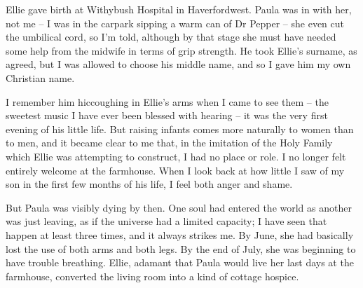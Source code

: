 Ellie gave birth at Withybush Hospital in Haverfordwest. Paula was in with her, not me -- I was in the carpark sipping a warm can of Dr Pepper -- she even cut the umbilical cord, so I'm told, although by that stage she must have needed some help from the midwife in terms of grip strength. He took Ellie's surname, as agreed, but I was allowed to choose his middle name, and so I gave him my own Christian name.

I remember him hiccoughing in Ellie's arms when I came to see them -- the sweetest music I have ever been blessed with hearing -- it was the very first evening of his little life. But raising infants comes more naturally to women than to men, and it became clear to me that, in the imitation of the Holy Family which Ellie was attempting to construct, I had no place or role. I no longer felt entirely welcome at the farmhouse. When I look back at how little I saw of my son in the first few months of his life, I feel both anger and shame.

But Paula was visibly dying by then. One soul had entered the world as another was just leaving, as if the universe had a limited capacity; I have seen that happen at least three times, and it always strikes me. By June, she had basically lost the use of both arms and both legs. By the end of July, she was beginning to have trouble breathing. Ellie, adamant that Paula would live her last days at the farmhouse, converted the living room into a kind of cottage hospice.
